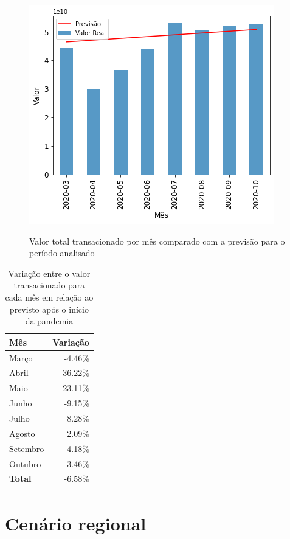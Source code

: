 \begin{figure}[htb]
	\centering
    \caption{Valor total transacionado por mês comparado com a previsão para o período analisado}
    \includegraphics[scale=0.7]{images/base-de-dados-18.2-valor-total-vs-previsao.png}
    \label{fig:pandemia:base-de-dados-18.2-valor-total-vs-previsao}
    \fdadospesquisa
\end{figure}

\begin{table}[htb]
\centering
\caption{Variação entre o valor transacionado para cada mês em relação ao previsto após o início da pandemia}
\label{tab:pandemia:valor-total-vs-previsao}
\begin{tabular}{lr}
\toprule
Mês & Variação \\
\midrule
Março &     -4.46\% \\
Abril &    -36.22\% \\
Maio &     -23.11\% \\
Junho &     -9.15\% \\
Julho &      8.28\% \\
Agosto &     2.09\% \\
Setembro &   4.18\% \\
Outubro &    3.46\% \\ \hline
\textbf{Total} & -6.58\% \\
\bottomrule
\end{tabular}
\fdadospesquisa
\end{table}

\section{Cenário regional}

